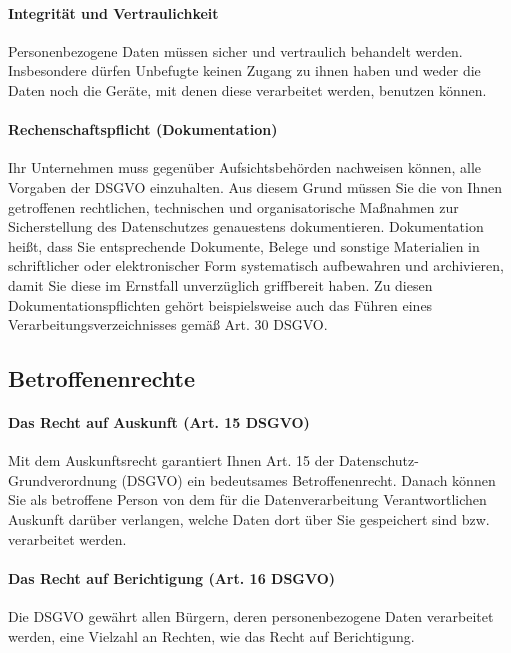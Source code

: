 \paragraph{Integrität und Vertraulichkeit} Personenbezogene Daten müssen sicher und vertraulich behandelt werden. Insbesondere dürfen Unbefugte keinen Zugang zu ihnen haben und weder die Daten noch die Geräte, mit denen diese verarbeitet werden, benutzen können.

\paragraph{Rechenschaftspflicht (Dokumentation)} Ihr Unternehmen muss gegenüber Aufsichtsbehörden nachweisen können, alle Vorgaben der DSGVO einzuhalten. Aus diesem Grund müssen Sie die von Ihnen getroffenen rechtlichen, technischen und organisatorische Maßnahmen zur Sicherstellung des Datenschutzes genauestens dokumentieren. Dokumentation heißt, dass Sie entsprechende Dokumente, Belege und sonstige Materialien in schriftlicher oder elektronischer Form systematisch aufbewahren und archivieren, damit Sie diese im Ernstfall unverzüglich griffbereit haben. Zu diesen Dokumentationspflichten gehört beispielsweise auch das Führen eines Verarbeitungsverzeichnisses gemäß Art. 30 DSGVO.

\subsection{Betroffenenrechte}
\label{sec:Betroffenenrechte}


\paragraph{Das Recht auf Auskunft (Art. 15 DSGVO)} Mit dem Auskunftsrecht garantiert Ihnen Art. 15 der Datenschutz-Grundverordnung (DSGVO) ein bedeutsames Betroffenenrecht. Danach können Sie als betroffene Person von dem für die Datenverarbeitung Verantwortlichen Auskunft darüber verlangen, welche Daten dort über Sie gespeichert sind bzw. verarbeitet werden.

\paragraph{Das Recht auf Berichtigung (Art. 16 DSGVO)} Die DSGVO gewährt allen Bürgern, deren personenbezogene Daten verarbeitet werden, eine Vielzahl an Rechten, wie das Recht auf Berichtigung.

